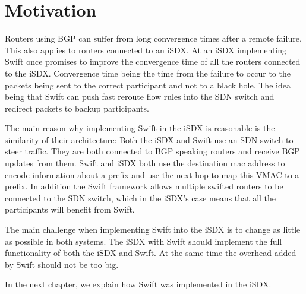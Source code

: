 
\chapter{\label{chapter3}Motivation}

Routers using BGP can suffer from long convergence times after a remote failure. This also applies to routers connected to an iSDX. At an iSDX implementing Swift once promises to improve the convergence time of all the routers connected to the iSDX. 
Convergence time being the time from the failure to occur to the packets being sent to the correct participant and not to a black hole. The idea being that Swift can push fast reroute flow rules into the SDN switch and redirect packets to backup participants.

The main reason why implementing Swift in the iSDX is reasonable is the similarity of their architecture: Both the iSDX and Swift use an SDN switch to steer traffic. They are both connected to BGP speaking routers and receive BGP updates from them. Swift and iSDX both use the destination mac address to encode information about a prefix and use the next hop to map this VMAC to a prefix. In addition the Swift framework allows multiple swifted routers to be connected to the SDN switch, which in the iSDX's case means that all the participants will benefit from Swift.

The main challenge when implementing Swift into the iSDX is to change as little as possible in both systems. The iSDX with Swift should implement the full functionality of both the iSDX and Swift. At the same time the overhead added by Swift should not be too big.

In the next chapter, we explain how Swift was implemented in the iSDX. 
